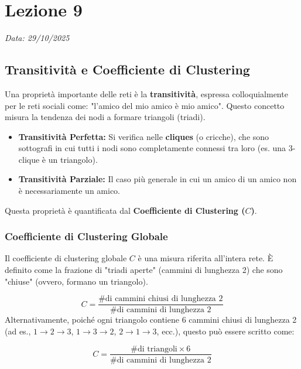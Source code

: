 \chapter{Lezione 9}
\label{chap:lezione_09} 

\begin{flushright}
\textit{Data: 29/10/2025}
\end{flushright}


\section{Transitività e Coefficiente di Clustering}
Una proprietà importante delle reti è la \textbf{transitività}, espressa colloquialmente per le reti sociali come: "l'amico del mio amico è mio amico". Questo concetto misura la tendenza dei nodi a formare triangoli (triadi).

\begin{itemize}
\item \textbf{Transitività Perfetta:} Si verifica nelle \textbf{cliques} (o cricche), che sono sottografi in cui tutti i nodi sono completamente connessi tra loro (es. una 3-clique è un triangolo).
\item \textbf{Transitività Parziale:} Il caso più generale in cui un amico di un amico non è necessariamente un amico.
\end{itemize}

Questa proprietà è quantificata dal \textbf{Coefficiente di Clustering ($C$)}.

\subsection{Coefficiente di Clustering Globale}
Il coefficiente di clustering globale $C$ è una misura riferita all'intera rete. È definito come la frazione di "triadi aperte" (cammini di lunghezza 2) che sono "chiuse" (ovvero, formano un triangolo).

\begin{equation}
C = \frac{\text{\# di cammini chiusi di lunghezza 2}}{\text{\# di cammini di lunghezza 2}}
\end{equation}
Alternativamente, poiché ogni triangolo contiene 6 cammini chiusi di lunghezza 2 (ad es., $1\to2\to3$, $1\to3\to2$, $2\to1\to3$, ecc.), questo può essere scritto come:

\begin{equation}
C = \frac{\text{\# di triangoli} \times 6}{\text{\# di cammini di lunghezza 2}}
\end{equation}

